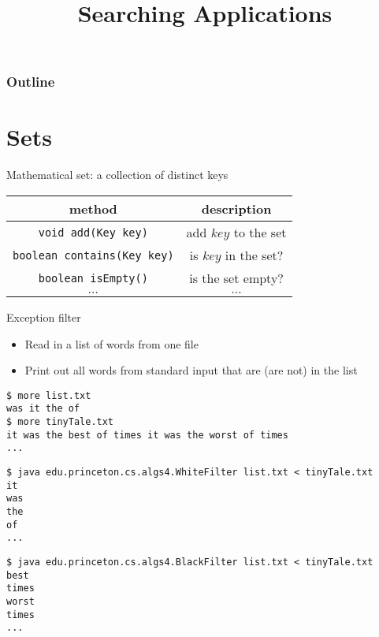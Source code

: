 \documentclass[8pt,a4paper,compress]{beamer}
\title{Searching Applications}
\date{}
\begin{document}
\begin{frame}
\vfill
\titlepage
\end{frame}

\begin{frame}
\frametitle{Outline}
\tableofcontents
\end{frame}

\section{Sets}
\begin{frame}[fragile]
Mathematical set: a collection of distinct keys
\begin{center}
\begin{tabular}{cc}
method & description \\ \hline
\lstinline$void add(Key key)$ & add $key$ to the set \\
\lstinline$boolean contains(Key key)$ & is $key$ in the set? \\
\lstinline$boolean isEmpty()$ & is the set empty? \\
$\dots$ & $\dots$
\end{tabular}
\end{center}

\bigskip

Exception filter
\begin{itemize}
\item Read in a list of words from one file

\item Print out all words from standard input that are (are not) in the list
\end{itemize}

\smallskip

\begin{lstlisting}[language={}]
$ more list.txt
was it the of
$ more tinyTale.txt
it was the best of times it was the worst of times
...
\end{lstlisting}

\begin{lstlisting}[language={}]
$ java edu.princeton.cs.algs4.WhiteFilter list.txt < tinyTale.txt 
it 
was 
the 
of 
...
\end{lstlisting}

\begin{lstlisting}[language={}]
$ java edu.princeton.cs.algs4.BlackFilter list.txt < tinyTale.txt
best 
times 
worst 
times
...
\end{lstlisting}
\end{frame}
\end{document}
